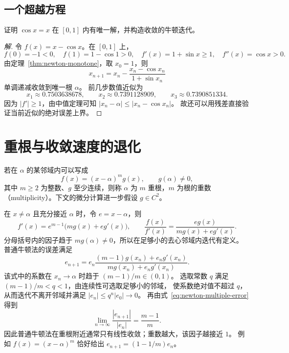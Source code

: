 \documentclass{ctexart}
\begin{document}
\subsection{一个超越方程}

\begin{example}[求解余弦不动点]\label{ex:newton-cos}
证明 $\cos x=x$ 在 $[0,1]$ 内有唯一解，并构造收敛的牛顿迭代。
\end{example}

\begin{proof}[解]
令 $f(x)=x-\cos x$。在 $[0,1]$ 上，
\[
  f(0)=-1<0,\quad f(1)=1-\cos1>0,\quad
  f'(x)=1+\sin x\ge1,\quad f''(x)=\cos x>0.
\]
由定理~\ref{thm:newton-monotone}，取 $x_0=1$，则
\[
  x_{n+1}=x_n-\frac{x_n-\cos x_n}{1+\sin x_n}
\]
单调递减收敛到唯一根 $\alpha$。
前几步数值近似为
\[
  x_1\approx0.7503638678,\qquad
  x_2\approx0.7391128909,\qquad
  x_3\approx0.7390851334.
\]
因为 $|f'|\ge1$，由中值定理可知 $|x_n-\alpha|\le|x_n-\cos x_n|$。
故还可以用残差直接验证当前近似的绝对误差上界。
\end{proof}

\section{重根与收敛速度的退化}
\label{sec:newton-multiple}

\begin{definition}[重根]
若在 $\alpha$ 的某邻域内可以写成
\[
  f(x)=(x-\alpha)^m g(x),\qquad g(\alpha)\ne0,
\]
其中 $m\ge2$ 为整数、$g$ 至少连续，则称 $\alpha$ 为 $m$ 重根，$m$ 为根的重数
（multiplicity）。下文的微分计算进一步假设 $g\in C^2$。
\end{definition}

在 $x\ne\alpha$ 且充分接近 $\alpha$ 时，令 $e=x-\alpha$，则
\[
  f'(x)=e^{m-1}\bigl(mg(x)+eg'(x)\bigr),\qquad
  \frac{f(x)}{f'(x)}=\frac{eg(x)}{mg(x)+eg'(x)}.
\]
分母括号内的因子趋于 $mg(\alpha)\ne0$，所以在足够小的去心邻域内迭代有定义。
普通牛顿法的误差满足
\begin{equation}\label{eq:newton-multiple-error}
  e_{n+1}=e_n\frac{(m-1)g(x_n)+e_ng'(x_n)}{mg(x_n)+e_ng'(x_n)}.
\end{equation}
该式中的系数在 $x_n\to\alpha$ 时趋于 $(m-1)/m\in(0,1)$。
选取常数 $q$ 满足 $(m-1)/m<q<1$，由连续性可选取足够小的邻域，
使系数绝对值不超过 $q$，从而迭代不离开邻域并满足 $|e_n|\le q^n|e_0|\to0$。
再由式~\eqref{eq:newton-multiple-error} 得到
\[
  \lim_{n\to\infty}\frac{|e_{n+1}|}{|e_n|}=\frac{m-1}{m}.
\]
因此普通牛顿法在重根附近通常只有线性收敛；重数越大，该因子越接近 $1$。
例如 $f(x)=(x-\alpha)^m$ 恰好给出 $e_{n+1}=(1-1/m)e_n$。
\end{document}
